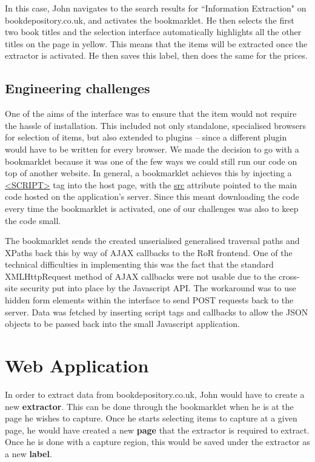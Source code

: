 In this case, John navigates to the search results for ``Information Extraction"
on bookdepository.co.uk, and activates the bookmarklet. He then selects the first
two book titles and the selection interface automatically highlights all the other
titles on the page in yellow. This means that the items will be extracted once the
extractor is activated. He then saves this label, then does the same for the prices.


\subsection{Engineering challenges}

One of the aims of the interface was to ensure that the item would not require the hassle of
installation. This included not only standalone, specialised browsers for selection of items,
but also extended to plugins -- since a different plugin would have to be written for every
browser. We made the decision to go with a bookmarklet because it was one of the few ways
we could still run our code on top of another website. In general, a bookmarklet achieves
this by injecting a \url{<SCRIPT>} tag into the host page, with the \url{src} attribute pointed
to the main code hosted on the application's server. Since this meant downloading the code
every time the bookmarklet is activated, one of our challenges was also to keep the code small.

The bookmarklet sends the created unserialised generalised traversal paths and XPaths back this
by way of AJAX callbacks to the RoR frontend. One of the technical difficulties in implementing
this was the fact that the standard XMLHttpRequest method of AJAX callbacks were not usable due
to the cross-site security put into place by the Javascript API. The workaround was to use
hidden form elements within the interface to send POST requests back to the server. Data was
fetched by inserting script tags and callbacks to allow the JSON objects to be passed back into
the small Javascript application.

\section{Web Application}

In order to extract data from bookdepository.co.uk, John would have to create a new 
\textbf{extractor}. This can be done through the bookmarklet when he is at the page 
he wishes to capture. Once he starts selecting items to capture at a given page,
he would have created a new \textbf{page} that the extractor is required to extract.
Once he is done with a capture region, this would be saved under the extractor as a
new \textbf{label}. 

